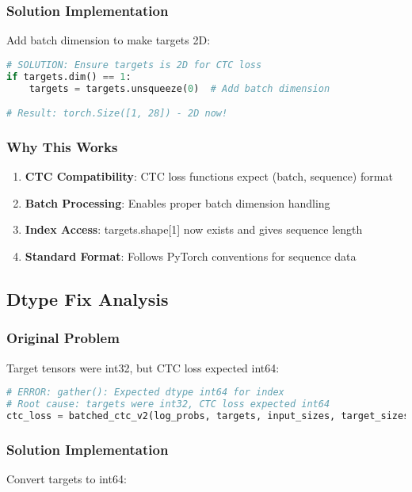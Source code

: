 \documentclass[11pt,a4paper]{article}
\begin{document}
\subsubsection{Solution Implementation}
Add batch dimension to make targets 2D:

\begin{lstlisting}[language=Python, caption=Dimension Fix]
# SOLUTION: Ensure targets is 2D for CTC loss
if targets.dim() == 1:
    targets = targets.unsqueeze(0)  # Add batch dimension

# Result: torch.Size([1, 28]) - 2D now!
\end{lstlisting}

\subsubsection{Why This Works}
\begin{enumerate}
    \item \textbf{CTC Compatibility}: CTC loss functions expect (batch, sequence) format
    \item \textbf{Batch Processing}: Enables proper batch dimension handling
    \item \textbf{Index Access}: targets.shape[1] now exists and gives sequence length
    \item \textbf{Standard Format}: Follows PyTorch conventions for sequence data
\end{enumerate}

\subsection{Dtype Fix Analysis}

\subsubsection{Original Problem}
Target tensors were int32, but CTC loss expected int64:

\begin{lstlisting}[language=Python, caption=Dtype Mismatch]
# ERROR: gather(): Expected dtype int64 for index
# Root cause: targets were int32, CTC loss expected int64
ctc_loss = batched_ctc_v2(log_probs, targets, input_sizes, target_sizes)
\end{lstlisting}

\subsubsection{Solution Implementation}
Convert targets to int64:
\end{document}
